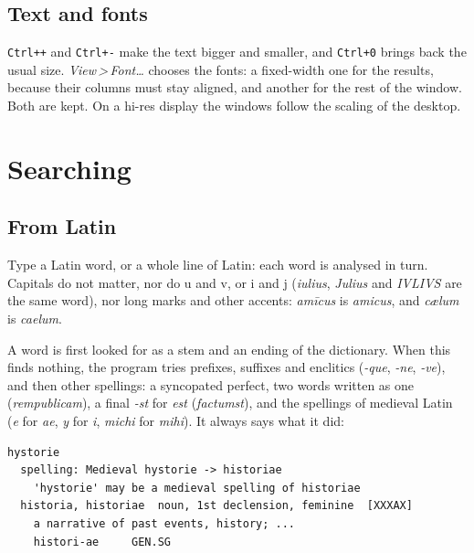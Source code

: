 \documentclass[12pt,
              article,
              oneside
              ]{memoir}
\newcommand*{\menu}[1]{\textit{#1}}
\newcommand*{\then}{\,>\,}
\newcommand*{\key}[1]{\texttt{#1}}
\begin{document}
\subsection{Text and fonts}

%
\key{Ctrl++} and \key{Ctrl+-} make the text bigger and smaller, and
\key{Ctrl+0} brings back the usual size. \menu{View\then Font\ldots}
chooses the fonts: a fixed-width one for the results, because their
columns must stay aligned, and another for the rest of the window. Both
are kept. On a hi-res display the windows follow the scaling of the
desktop.

\section{Searching}
\label{sec:searching}

\subsection{From Latin}

%
Type a Latin word, or a whole line of Latin: each word is analysed in
turn. Capitals do not matter, nor do u and v, or i and j (\textit{iulius},
\textit{Julius} and \textit{IVLIVS} are the same word), nor long marks and
other accents: \textit{amīcus} is \textit{amicus}, and \textit{cælum} is
\textit{caelum}.

%
A word is first looked for as a stem and an ending of the dictionary.
When this finds nothing, the program tries prefixes, suffixes and
enclitics (\textit{-que}, \textit{-ne}, \textit{-ve}), and then other
spellings: a syncopated perfect, two words written as one
(\textit{rempublicam}), a final \textit{-st} for \textit{est}
(\textit{factumst}), and the spellings of medieval Latin (\textit{e} for
\textit{ae}, \textit{y} for \textit{i}, \textit{michi} for \textit{mihi}).
It always says what it did:

\begin{verbatim}
hystorie
  spelling: Medieval hystorie -> historiae
    'hystorie' may be a medieval spelling of historiae
  historia, historiae  noun, 1st declension, feminine  [XXXAX]
    a narrative of past events, history; ...
    histori-ae     GEN.SG
\end{verbatim}
\end{document}
